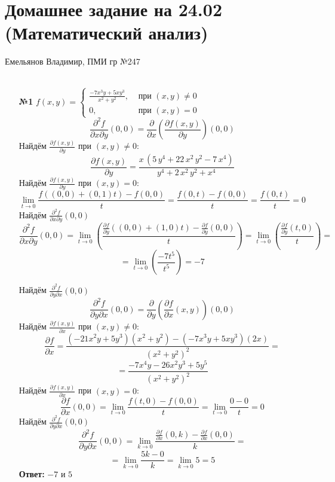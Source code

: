 \documentclass[a4paper]{article}
\renewcommand{\f}[2]{\frac{#1}{#2}}
\newcommand{\case}[1]{\begin{cases} #1 \end{cases}}
\newcommand{\lm}[1]{\underset{#1}{\lim}}
\newcommand{\p}{\partial}
\renewcommand{\l}{\left(}
\renewcommand{\r}{\right)}
\begin{document}
\section*{Домашнее задание на 24.02 (Математический анализ)}
 {\large Емельянов Владимир, ПМИ гр №247}\\\\
\begin{enumerate}
    \item[\textbf{№1}]$f(x, y) = \case{
        \f{-7x^3y+5xy^3}{x^2+y^2}, & \text{ при } (x, y) \neq 0\\
        0, & \text{ при } (x, y) = 0
    }$
    $$\f{\p^2 f}{\p x \p y}(0, 0) = \f{\p}{\p x}\left(\f{\p f(x, y)}{\p y}\right)(0, 0)$$
    Найдём $\f{\p f(x, y)}{\p y}$ при $(x, y) \neq 0$:
    $$\f{\p f(x, y)}{\p y} = \dfrac{x\,\left(5\,{y}^{4}+22\,{x}^{2}\,{y}^{2}-7\,{x}^{4}\right)}{{y}^{4}+2\,{x}^{2}\,{y}^{2}+{x}^{4}}$$
    Найдём $\f{\p f(x, y)}{\p y}$ при $(x, y) = 0$:
    $$\lm{t \to 0}\f{f((0, 0) + (0, 1)t) - f(0, 0)}{t} = \f{f(0, t) - f(0, 0)}{t} = \f{f(0, t)}{t} =0$$
    Найдём $\f{\p^2 f}{\p x \p y}(0, 0)$
    $$\f{\p^2 f}{\p x \p y}(0, 0) =
     \lm{t \to 0} \l \f{\f{\p f}{\p y} ((0, 0) + (1, 0)t) - \f{\p f}{\p y}(0, 0)}{t}\r = \lm{t \to 0} \l \f{\f{\p f}{\p y} (t, 0)}{t}\r = $$
     $$=\lm{t \to 0} \l \dfrac{-7{t}^{5}}{{t}^{5}}\r = -7$$

    Найдём $\f{\p^2 f}{\p y \p x}(0, 0)$
    $$\f{\p^2 f}{\p y \p x}(0, 0) =\f{\p}{\p y}\l\f{\p f}{\p x}(x, y)\r(0, 0) $$
    Найдём $\f{\p f(x, y)}{\p x}$ при $(x, y) \neq 0$:
    \[
    \frac{\partial f}{\partial x} = \frac{(-21x^2y + 5y^3)(x^2 + y^2) - (-7x^3y + 5xy^3)(2x)}{(x^2 + y^2)^2}=
    \]
    \[
    =\frac{-7x^4y - 26x^2y^3 + 5y^5}{(x^2 + y^2)^2}
    \]
    Найдём $\f{\p f(x, y)}{\p x}$ при $(x, y) = 0$:
    \[
    \frac{\partial f}{\partial x}(0, 0) = \lim_{t \to 0} \frac{f(t, 0) - f(0, 0)}{t} = \lim_{t \to 0} \frac{0 - 0}{t} = 0
    \]
    Найдём $\f{\p^2 f}{\p y \p x}(0, 0)$
    \[
    \frac{\partial^2 f}{\partial y \partial x}(0, 0) = \lim_{k \to 0} \frac{\frac{\partial f}{\partial x}(0, k) - \frac{\partial f}{\partial x}(0, 0)}{k}=
    \]
    $$=\lim_{k \to 0} \frac{5k - 0}{k} = \lim_{k \to 0} 5 = 5$$
    \textbf{Ответ:} $-7$ и $5$\\


\end{enumerate}
\end{document}
